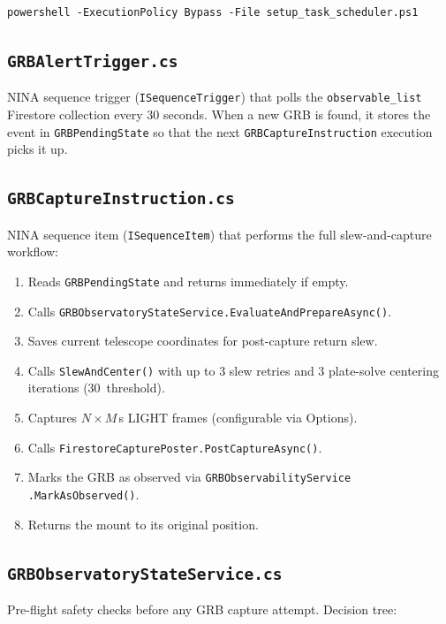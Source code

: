 \documentclass[12pt,a4paper]{article}
\begin{document}
\begin{lstlisting}[style=bash, caption={One-time setup}]
powershell -ExecutionPolicy Bypass -File setup_task_scheduler.ps1
\end{lstlisting}

\subsection{\texttt{GRBAlertTrigger.cs}}

NINA sequence trigger (\texttt{ISequenceTrigger}) that polls the
\texttt{observable\_list} Firestore collection every 30 seconds. When a
new GRB is found, it stores the event in \texttt{GRBPendingState} so that
the next \texttt{GRBCaptureInstruction} execution picks it up.

\subsection{\texttt{GRBCaptureInstruction.cs}}

NINA sequence item (\texttt{ISequenceItem}) that performs the full
slew-and-capture workflow:

\begin{enumerate}
    \item Reads \texttt{GRBPendingState} and returns immediately if empty.
    \item Calls \texttt{GRBObservatoryStateService.EvaluateAndPrepareAsync()}.
    \item Saves current telescope coordinates for post-capture return slew.
    \item Calls \texttt{SlewAndCenter()} with up to 3 slew retries and
          3 plate-solve centering iterations (30\arcsec\ threshold).
    \item Captures $N \times M$\,s LIGHT frames (configurable via Options).
    \item Calls \texttt{FirestoreCapturePoster.PostCaptureAsync()}.
    \item Marks the GRB as observed via \texttt{GRBObservabilityService
          .MarkAsObserved()}.
    \item Returns the mount to its original position.
\end{enumerate}

\subsection{\texttt{GRBObservatoryStateService.cs}}

Pre-flight safety checks before any GRB capture attempt. Decision tree:
\end{document}
